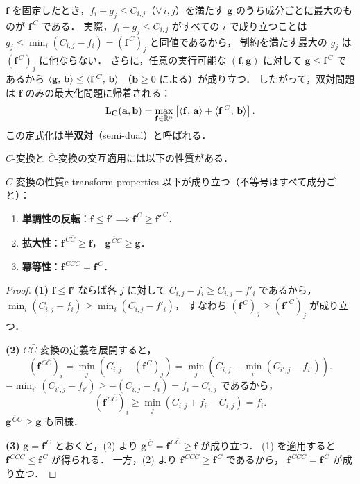 $\mathbf{f}$ を固定したとき，$f_i + g_j \leq C_{i,j}$（$\forall\, i, j$）を満たす
$\mathbf{g}$ のうち成分ごとに最大のものが $\mathbf{f}^{\,C}$ である．
実際，$f_i + g_j \leq C_{i,j}$ がすべての $i$ で成り立つことは
$g_j \leq \min_i (C_{i,j} - f_i) = (\mathbf{f}^{\,C})_j$ と同値であるから，
制約を満たす最大の $g_j$ は $(\mathbf{f}^{\,C})_j$ に他ならない．
さらに，任意の実行可能な $(\mathbf{f}, \mathbf{g})$ に対して
$\mathbf{g} \leq \mathbf{f}^{\,C}$ であるから
$\langle \mathbf{g},\, \mathbf{b} \rangle \leq \langle \mathbf{f}^{\,C},\, \mathbf{b} \rangle$
（$\mathbf{b} \geq 0$ による）が成り立つ．
したがって，双対問題は $\mathbf{f}$ のみの最大化問題に帰着される：
\[
  \mathrm{L}_{\mathbf{C}}(\mathbf{a}, \mathbf{b})
  = \max_{\mathbf{f} \in \mathbb{R}^n}
  \left[ \langle \mathbf{f},\, \mathbf{a} \rangle + \langle \mathbf{f}^{\,C},\, \mathbf{b} \rangle \right].
\]
この定式化は\textbf{半双対}（semi-dual）と呼ばれる．

$C$-変換と $\bar{C}$-変換の交互適用には以下の性質がある．

\begin{proposition}{$C$-変換の性質}{c-transform-properties}
  以下が成り立つ（不等号はすべて成分ごと）：
  \begin{enumerate}
    \item \textbf{単調性の反転}：$\mathbf{f} \leq \mathbf{f}' \implies \mathbf{f}^{\,C} \geq \mathbf{f}'^{\,C}$．
    \item \textbf{拡大性}：$\mathbf{f}^{\,C\bar{C}} \geq \mathbf{f}$，
      $\mathbf{g}^{\,\bar{C}C} \geq \mathbf{g}$．
    \item \textbf{冪等性}：$\mathbf{f}^{\,C\bar{C}C} = \mathbf{f}^{\,C}$．
  \end{enumerate}
\end{proposition}

\begin{proof}
  \textbf{(1)}
  $\mathbf{f} \leq \mathbf{f}'$ ならば各 $j$ に対して
  $C_{i,j} - f_i \geq C_{i,j} - f'_i$ であるから，
  $\min_i (C_{i,j} - f_i) \geq \min_i (C_{i,j} - f'_i)$，
  すなわち $(\mathbf{f}^{\,C})_j \geq (\mathbf{f}'^{\,C})_j$ が成り立つ．

  \textbf{(2)}
  $C\bar{C}$-変換の定義を展開すると，
  \[
    (\mathbf{f}^{\,C\bar{C}})_i
    = \min_{j} \left( C_{i,j} - (\mathbf{f}^{\,C})_j \right)
    = \min_{j} \left( C_{i,j} - \min_{i'} (C_{i',j} - f_{i'}) \right).
  \]
  $-\min_{i'} (C_{i',j} - f_{i'}) \geq -(C_{i,j} - f_i) = f_i - C_{i,j}$ であるから，
  \[
    (\mathbf{f}^{\,C\bar{C}})_i \geq \min_{j} (C_{i,j} + f_i - C_{i,j}) = f_i.
  \]
  $\mathbf{g}^{\,\bar{C}C} \geq \mathbf{g}$ も同様．

  \textbf{(3)}
  $\mathbf{g} = \mathbf{f}^{\,C}$ とおくと，(2) より
  $\mathbf{g}^{\,\bar{C}} = \mathbf{f}^{\,C\bar{C}} \geq \mathbf{f}$ が成り立つ．
  (1) を適用すると $\mathbf{f}^{\,C\bar{C}C} \leq \mathbf{f}^{\,C}$ が得られる．
  一方，(2) より $\mathbf{f}^{\,C\bar{C}C} \geq \mathbf{f}^{\,C}$ であるから，
  $\mathbf{f}^{\,C\bar{C}C} = \mathbf{f}^{\,C}$ が成り立つ．
\end{proof}

